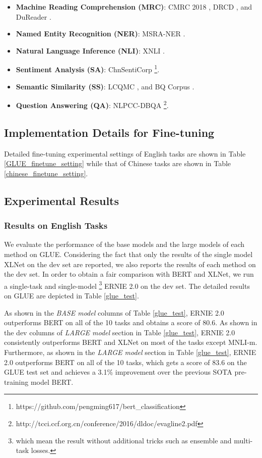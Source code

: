 \documentclass[letterpaper]{article} \usepackage{aaai20}  \usepackage{times}  \usepackage{helvet} \usepackage{courier}  \usepackage[hyphens]{url}  \usepackage{graphicx} \usepackage{makecell}
\begin{document}
\begin{itemize}
  \item \textbf{Machine Reading Comprehension (MRC)}: CMRC 2018 \cite{DBLP:journals/corr/abs-1810-07366}, DRCD \cite{shao2018drcd}, and DuReader \cite{he2017dureader}.
  \item \textbf{Named Entity Recognition (NER)}: MSRA-NER \cite{levow2006third}.
  \item \textbf{Natural Language Inference (NLI)}: XNLI \cite{conneau2018xnli}.
  \item \textbf{Sentiment Analysis (SA)}: ChnSentiCorp \footnote{https://github.com/pengming617/bert\_classification}.
  \item \textbf{Semantic Similarity (SS)}: LCQMC \cite{liu2018lcqmc}, and BQ Corpus \cite{chen2018bq}.
  \item \textbf{Question Answering (QA)}: NLPCC-DBQA \footnote{http://tcci.ccf.org.cn/conference/2016/dldoc/evagline2.pdf}.
\end{itemize}
\subsection{Implementation Details for Fine-tuning}
Detailed fine-tuning experimental settings of English tasks are shown in Table \ref{GLUE_finetune_setting} while that of Chinese tasks are shown in Table \ref{chinese_finetune_setting}.


\subsection{Experimental Results}
\subsubsection{Results on English Tasks}
We evaluate the performance of the base models and the large models of each method on GLUE. 
Considering the fact that only the results of the single model XLNet on the dev set are reported, we also reports the results of each method on the dev set. 
In order to obtain a fair comparison with BERT and XLNet, we run a single-task and single-model \footnote{which mean the result without additional tricks such as ensemble and multi-task losses.} ERNIE 2.0 on the dev set. The detailed results on GLUE are depicted in Table \ref{glue_test}. 

As shown in the \textit{BASE model} columns of Table \ref{glue_test}, ERNIE 2.0 outperforms BERT on all of the 10 tasks and obtains a score of 80.6. As shown in the dev columns of \textit{LARGE model} section in Table \ref{glue_test}, ERNIE 2.0 consistently outperforms BERT and XLNet on most of the tasks except MNLI-m. Furthermore, as shown in the \textit{LARGE model} section in Table \ref{glue_test}, ERNIE 2.0 outperforms BERT on all of the 10 tasks, which gets a score of 83.6 on the GLUE test set and achieves a 3.1\% improvement over the previous SOTA pre-training model BERT. 
\end{document}
